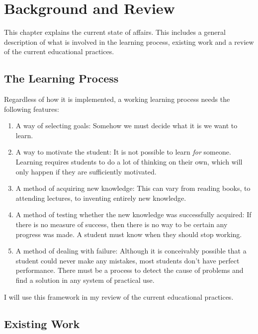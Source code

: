 \chapter{Background and Review}
\label{chapter:background}
  This chapter explains the current state of affairs. This includes a general description of what is involved in the learning process, existing work and a review of the current educational practices.

  \section{The Learning Process}
    \label{section:learning_process}
    Regardless of how it is implemented, a working learning process needs the following features:

    \begin{enumerate}
      \item A way of selecting goals: Somehow we must decide what it is we want to learn.

      \item A way to motivate the student: It is not possible to learn \emph{for} someone. Learning requires students to do a lot of thinking on their own, which will only happen if they are sufficiently motivated.

      \item A method of acquiring new knowledge: This can vary from reading books, to attending lectures, to inventing entirely new knowledge.

      \item A method of testing whether the new knowledge was successfully acquired: If there is no measure of success, then there is no way to be certain any progress was made. A student must know when they should stop working.

      \item A method of dealing with failure: Although it is conceivably possible that a student could never make any mistakes, most students don't have perfect performance. There must be a process to detect the cause of problems and find a solution in any system of practical use.
    \end{enumerate}

    I will use this framework in my review of the current educational practices.

  \section{Existing Work}

